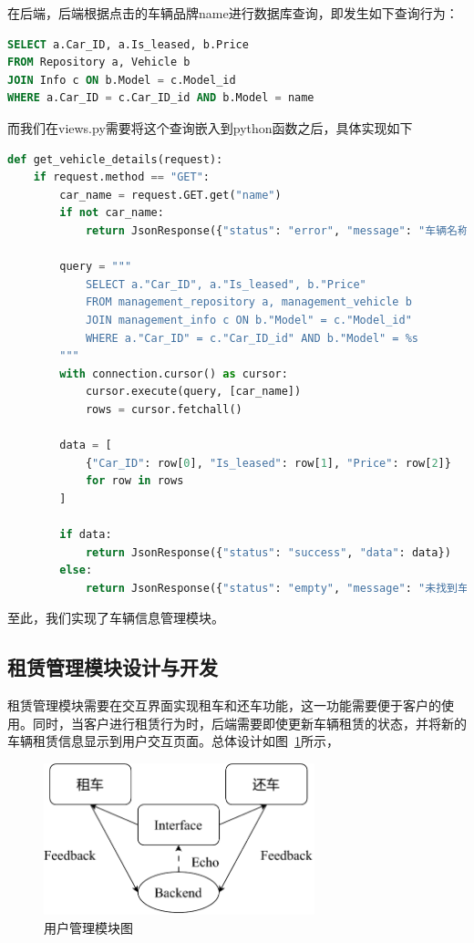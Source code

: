 \documentclass[UTF8,a4paper,12pt]{ctexart}
\begin{document}
在后端，后端根据点击的车辆品牌name进行数据库查询，即发生如下查询行为：
\begin{lstlisting}[language=SQL]
SELECT a.Car_ID, a.Is_leased, b.Price
FROM Repository a, Vehicle b
JOIN Info c ON b.Model = c.Model_id
WHERE a.Car_ID = c.Car_ID_id AND b.Model = name
\end{lstlisting}
而我们在views.py需要将这个查询嵌入到python函数之后，具体实现如下
\begin{lstlisting}[language=Python]
def get_vehicle_details(request):
    if request.method == "GET":
        car_name = request.GET.get("name")
        if not car_name:
            return JsonResponse({"status": "error", "message": "车辆名称不能为空"})

        query = """
            SELECT a."Car_ID", a."Is_leased", b."Price"
            FROM management_repository a, management_vehicle b
            JOIN management_info c ON b."Model" = c."Model_id"
            WHERE a."Car_ID" = c."Car_ID_id" AND b."Model" = %s
        """
        with connection.cursor() as cursor:
            cursor.execute(query, [car_name])
            rows = cursor.fetchall()

        data = [
            {"Car_ID": row[0], "Is_leased": row[1], "Price": row[2]}
            for row in rows
        ]

        if data:
            return JsonResponse({"status": "success", "data": data})
        else:
            return JsonResponse({"status": "empty", "message": "未找到车辆详情"})
\end{lstlisting}
至此，我们实现了车辆信息管理模块。

\subsection{租赁管理模块设计与开发}
租赁管理模块需要在交互界面实现租车和还车功能，这一功能需要便于客户的使用。同时，当客户进行租赁行为时，后端需要即使更新车辆租赁的状态，并将新的车辆租赁信息显示到用户交互页面。总体设计如图~\ref{fig:lease}所示，
\begin{figure}[htbp]  %
    \centering  %
    \includegraphics[width=0.7\textwidth]{pic/lease.pdf}
    \caption{用户管理模块图}  %
    \label{fig:lease}  %
\end{figure}
\end{document}
